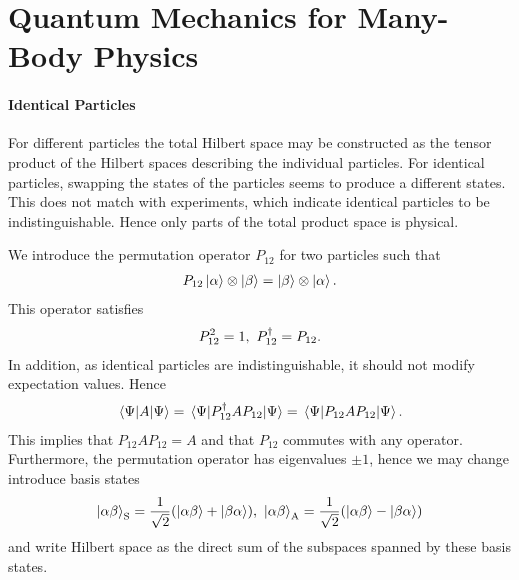 \section{Quantum Mechanics for Many-Body Physics}

\paragraph{Identical Particles}
For different particles the total Hilbert space may be constructed as the tensor product of the Hilbert spaces describing the individual particles. For identical particles, swapping the states of the particles seems to produce a different states. This does not match with experiments, which indicate identical particles to be indistinguishable. Hence only parts of the total product space is physical.

We introduce the permutation operator $P_{12}$ for two particles such that
\begin{align*}
	P_{12}\ket{\alpha}\otimes\ket{\beta} = \ket{\beta}\otimes\ket{\alpha}.
\end{align*}
This operator satisfies
\begin{align*}
	P_{12}^{2} = 1,\ P_{12}^{\dagger} = P_{12}.
\end{align*}
In addition, as identical particles are indistinguishable, it should not modify expectation values. Hence
\begin{align*}
	\expval{A}{\Psi} = \expval{P_{12}^{\dagger}AP_{12}}{\Psi} = \expval{P_{12}AP_{12}}{\Psi}.
\end{align*}
This implies that $P_{12}AP_{12} = A$ and that $P_{12}$ commutes with any operator. Furthermore, the permutation operator has eigenvalues $\pm 1$, hence we may change introduce basis states
\begin{align*}
	\ket{\alpha\beta}_{\text{S}} = \frac{1}{\sqrt{2}}(\ket{\alpha\beta} + \ket{\beta\alpha}),\ \ket{\alpha\beta}_{\text{A}} = \frac{1}{\sqrt{2}}(\ket{\alpha\beta} - \ket{\beta\alpha})
\end{align*}
and write Hilbert space as the direct sum of the subspaces spanned by these basis states.

